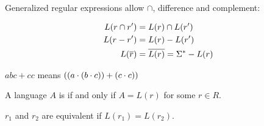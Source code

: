 \documentclass[11pt, cyan, night, 0.5in]{LatexTemplate/hw}
\begin{document}
Generalized regular expressions allow $\cap$, difference and complement:

\begin{align*}
    L(r\cap r') &= L(r)\cap L(r')\\
    L(r-r') &= L(r) - L(r')\\
    L(\overline{r}) &= \overline{L(r)} = \Sigma^* - L(r)
\end{align*}

$abc+cc$ means $((a\cdot (b\cdot c)) + (c\cdot c))$

A language $A$ is \underline{} if and only if $A=L(r)$ for some $r\in R$.

$r_1$ and $r_2$ are equivalent if $L(r_1)=L(r_2)$.

\end{document}
